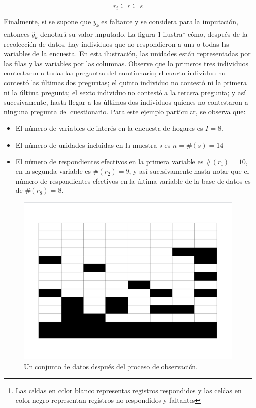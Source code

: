\documentclass[
  12pt,
]{book}
\providecommand{\tightlist}{%
  \setlength{\itemsep}{0pt}\setlength{\parskip}{0pt}}
\begin{document}
\[
r_i\subseteq r \subseteq s
\]

Finalmente, si se supone que \(y_k\) es faltante y se considera para la imputación, entonces \(\hat{y}_k\) denotará su valor imputado. La figura \ref{fig:figbaseincom} ilustra\footnote{Las celdas en color blanco representas registros respondidos y las celdas en color negro representan registros no respondidos y faltantes} cómo, después de la recolección de datos, hay individuos que no respondieron a una o todas las variables de la encuesta. En esta ilustración, las unidades están representadas por las filas y las variables por las columnas. Observe que lo primeros tres individuos contestaron a todas las preguntas del cuestionario; el cuarto individuo no contestó las últimas dos preguntas; el quinto individuo no contestó ni la primera ni la última pregunta; el sexto individuo no contestó a la tercera pregunta; y así sucesivamente, hasta llegar a los últimos dos individuos quienes no contestaron a ninguna pregunta del cuestionario. Para este ejemplo particular, se observa que:

\begin{itemize}
\tightlist
\item
  El número de variables de interés en la encuesta de hogares es \(I=8\).
\item
  El número de unidades incluidas en la muestra \(s\) es \(n=\#(s)=14\).
\item
  El número de respondientes efectivos en la primera variable es \(\#(r_1)=10\), en la segunda variable es \(\#(r_2)=9\), y así sucesivamente hasta notar que el número de respondientes efectivos en la última variable de la base de datos es de \(\#(r_8)=8\).
\end{itemize}

\begin{figure}
\includegraphics[width=0.5\linewidth]{Pics/j1} \caption{Un conjunto de datos después del proceso de observación.}\label{fig:figbaseincom}
\end{figure}
\end{document}

